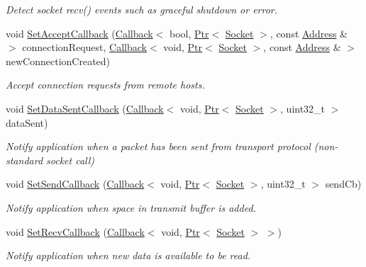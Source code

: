 \begin{DoxyCompactItemize}
\begin{DoxyCompactList}\small\item\em Detect socket recv() events such as graceful shutdown or error. \end{DoxyCompactList}\item 
void \hyperlink{classns3_1_1Socket_a408532e435c63166e6ccc337c0cea871}{Set\+Accept\+Callback} (\hyperlink{classns3_1_1Callback}{Callback}$<$ bool, \hyperlink{classns3_1_1Ptr}{Ptr}$<$ \hyperlink{classns3_1_1Socket}{Socket} $>$, const \hyperlink{classns3_1_1Address}{Address} \& $>$ connection\+Request, \hyperlink{classns3_1_1Callback}{Callback}$<$ void, \hyperlink{classns3_1_1Ptr}{Ptr}$<$ \hyperlink{classns3_1_1Socket}{Socket} $>$, const \hyperlink{classns3_1_1Address}{Address} \& $>$ new\+Connection\+Created)
\begin{DoxyCompactList}\small\item\em Accept connection requests from remote hosts. \end{DoxyCompactList}\item 
void \hyperlink{classns3_1_1Socket_a7857525a481afb48f485598a57c7f235}{Set\+Data\+Sent\+Callback} (\hyperlink{classns3_1_1Callback}{Callback}$<$ void, \hyperlink{classns3_1_1Ptr}{Ptr}$<$ \hyperlink{classns3_1_1Socket}{Socket} $>$, uint32\+\_\+t $>$ data\+Sent)
\begin{DoxyCompactList}\small\item\em Notify application when a packet has been sent from transport protocol (non-\/standard socket call) \end{DoxyCompactList}\item 
void \hyperlink{classns3_1_1Socket_a85ff5c8cc7d242823f301b49264c68a4}{Set\+Send\+Callback} (\hyperlink{classns3_1_1Callback}{Callback}$<$ void, \hyperlink{classns3_1_1Ptr}{Ptr}$<$ \hyperlink{classns3_1_1Socket}{Socket} $>$, uint32\+\_\+t $>$ send\+Cb)
\begin{DoxyCompactList}\small\item\em Notify application when space in transmit buffer is added. \end{DoxyCompactList}\item 
void \hyperlink{classns3_1_1Socket_a243f7835ef1a85f9270fd3577e3a40da}{Set\+Recv\+Callback} (\hyperlink{classns3_1_1Callback}{Callback}$<$ void, \hyperlink{classns3_1_1Ptr}{Ptr}$<$ \hyperlink{classns3_1_1Socket}{Socket} $>$ $>$)
\begin{DoxyCompactList}\small\item\em Notify application when new data is available to be read. \end{DoxyCompactList}\item 

\end{DoxyCompactItemize}
